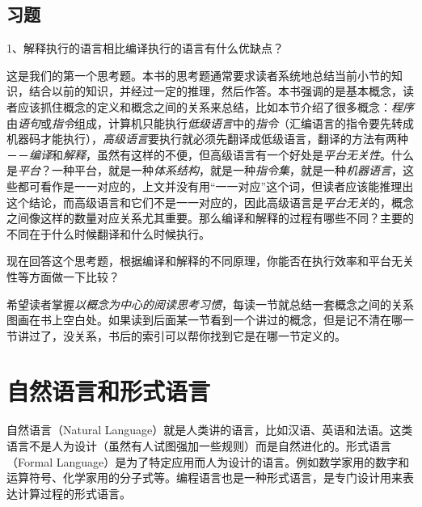 \subsection*{习题}
%


1、解释执行的语言相比编译执行的语言有什么优缺点？



这是我们的第一个思考题。本书的思考题通常要求读者系统地总结当前小节的知识，结合以前的知识，并经过一定的推理，然后作答。本书强调的是基本概念，读者应该抓住概念的定义和概念之间的关系来总结，比如本节介绍了很多概念：\emph{程序}由\emph{语句}或\emph{指令}组成，计算机只能执行\emph{低级语言}中的\emph{指令}（汇编语言的指令要先转成机器码才能执行），\emph{高级语言}要执行就必须先翻译成低级语言，翻译的方法有两种－－\emph{编译}和\emph{解释}，虽然有这样的不便，但高级语言有一个好处是\emph{平台无关性}。什么是\emph{平台}？一种平台，就是一种\emph{体系结构}，就是一种\emph{指令集}，就是一种\emph{机器语言}，这些都可看作是一一对应的，上文并没有用“一一对应”这个词，但读者应该能推理出这个结论，而高级语言和它们不是一一对应的，因此高级语言是\emph{平台无关}的，概念之间像这样的数量对应关系尤其重要。那么编译和解释的过程有哪些不同？主要的不同在于什么时候翻译和什么时候执行。



现在回答这个思考题，根据编译和解释的不同原理，你能否在执行效率和平台无关性等方面做一下比较？



希望读者掌握\emph{以概念为中心的阅读思考习惯}，每读一节就总结一套概念之间的关系图画在书上空白处。如果读到后面某一节看到一个讲过的概念，但是记不清在哪一节讲过了，没关系，书后的索引可以帮你找到它是在哪一节定义的。




\section{自然语言和形式语言}
%
自然语言（Natural Language）就是人类讲的语言，比如汉语、英语和法语。这类语言不是人为设计（虽然有人试图强加一些规则）而是自然进化的。形式语言（Formal Language）是为了特定应用而人为设计的语言。例如数学家用的数字和运算符号、化学家用的分子式等。编程语言也是一种形式语言，是专门设计用来表达计算过程的形式语言。



